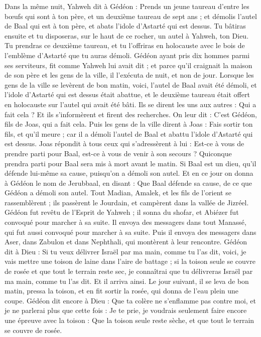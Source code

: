\begin{multicols}{2}
Dans la même nuit, Yahweh dit à Gédéon : Prends un jeune taureau d'entre les bœufs qui sont à ton père, et un deuxième taureau de sept ans ; et démolis l'autel de Baal qui est à ton père, et abats l’idole d'Astarté qui est dessus.
Tu bâtiras ensuite et tu disposeras, sur le haut de ce rocher, un autel à Yahweh, ton Dieu. Tu prendras ce deuxième taureau, et tu l'offriras en holocauste avec le bois de l’emblème d’Astarté que tu auras démoli.
Gédéon ayant pris dix hommes parmi ses serviteurs, fit comme Yahweh lui avait dit ; et parce qu'il craignait la maison de son père et les gens de la ville, il l’exécuta de nuit, et non de jour.
Lorsque les gens de la ville se levèrent de bon matin, voici, l'autel de Baal avait été démoli, et l'idole d'Astarté qui est dessus était abattue, et le deuxième taureau était offert en holocauste sur l'autel qui avait été bâti.
Ils se dirent les uns aux autres : Qui a fait cela ? Et ils s’informèrent et firent des recherches. On leur dit : C’est Gédéon, fils de Joas, qui a  fait cela.
Puis les gens de la ville dirent à Joas : Fais sortir ton fils, et qu'il meure ; car il a démoli l'autel de Baal et abattu l'idole d'Astarté qui est dessus.
Joas répondit à tous ceux qui s'adressèrent à lui : Est-ce à vous de prendre parti pour Baal, est-ce à vous de venir à son secours ? Quiconque prendra parti pour Baal sera mis à mort avant le matin. Si Baal est un dieu, qu'il défende lui-même sa cause, puisqu'on a démoli son autel.
Et en ce jour on donna à Gédéon le nom de Jerubbaal, en disant : Que Baal défende sa cause, de ce que Gédéon a démoli son autel.
Tout Madian, Amalek, et les fils de l’orient se rassemblèrent ;  ils passèrent le Jourdain, et campèrent dans la vallée de Jizréel.
Gédéon fut revêtu de l'Esprit de Yahweh ; il sonna du shofar, et Abiézer fut convoqué pour marcher à sa suite.
Il envoya des messagers dans tout Manassé, qui fut aussi convoqué pour marcher à sa suite. Puis il envoya des messagers dans Aser, dans Zabulon et dans Nephthali, qui montèrent à leur rencontre.
Gédéon dit à Dieu : Si tu veux délivrer Israël par ma main, comme tu l'as dit,
voici, je vais mettre une toison de laine dans l'aire de battage ; si la toison seule se couvre de rosée et que tout le terrain reste sec, je connaîtrai que tu délivreras Israël par ma main, comme tu l’as dit.
Et il arriva ainsi. Le jour suivant, il se leva de bon matin, pressa la toison, et en fit sortir la rosée, qui donna de l’eau plein une coupe.
Gédéon dit encore à Dieu : Que ta colère ne s'enflamme pas contre moi, et je ne parlerai plus que cette fois : Je te prie, je voudrais seulement faire encore une épreuve avec la toison : Que la toison seule reste sèche, et que tout le terrain se couvre de rosée.

\end{multicols}
